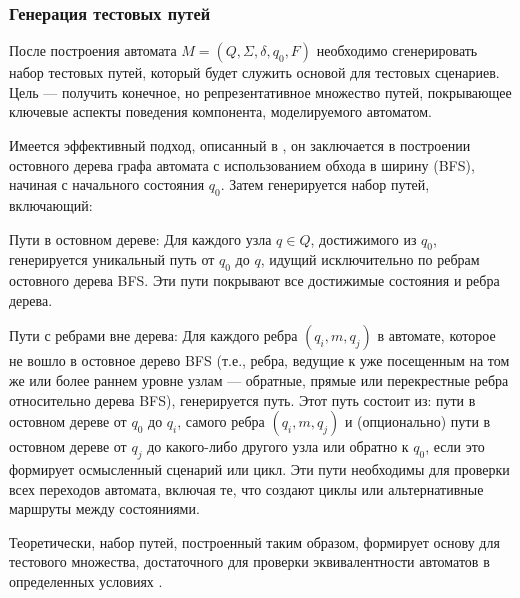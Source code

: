 \documentclass[14pt, russian]{scrartcl}
\begin{document}
\subsubsection{Генерация тестовых путей}

После построения автомата $M = (Q, \Sigma, \delta, q_0, F)$ необходимо сгенерировать набор тестовых путей, который будет служить основой для тестовых сценариев. Цель — получить конечное, но репрезентативное множество путей, покрывающее ключевые аспекты поведения компонента, моделируемого автоматом.

Имеется эффективный подход, описанный в \cite{Karhumaki1992}, он заключается в построении остовного дерева графа автомата с использованием обхода в ширину (BFS), начиная с начального состояния $q_0$. Затем генерируется набор путей, включающий:

\begin{enumerate*}
    \item {Пути в остовном дереве:} Для каждого узла $q \in Q$, достижимого из $q_0$, генерируется уникальный путь от $q_0$ до $q$, идущий исключительно по ребрам остовного дерева BFS. Эти пути покрывают все достижимые состояния и ребра дерева.
    \item {Пути с ребрами вне дерева:} Для каждого ребра $(q_i, m, q_j)$ в автомате, которое не вошло в остовное дерево BFS (т.е., ребра, ведущие к уже посещенным на том же или более раннем уровне узлам — обратные, прямые или перекрестные ребра относительно дерева BFS), генерируется путь. Этот путь состоит из:
            пути в остовном дереве от $q_0$ до $q_i$,
            самого ребра $(q_i, m, q_j)$ и
            (опционально) пути в остовном дереве от $q_j$ до какого-либо другого узла или обратно к $q_0$, если это формирует осмысленный сценарий или цикл.
        Эти пути необходимы для проверки всех переходов автомата, включая те, что создают циклы или альтернативные маршруты между состояниями.
\end{enumerate*}

Теоретически, набор путей, построенный таким образом, формирует основу для тестового множества, достаточного для проверки эквивалентности автоматов в определенных условиях \cite{Karhumaki1992}.
\end{document}
